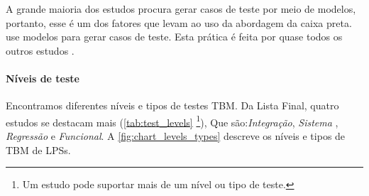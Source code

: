 A grande maioria dos estudos procura gerar casos de teste por meio de modelos, portanto, esse é um dos fatores que levam ao uso da abordagem da caixa preta. \citet{Steffens_et_al2012} use modelos para gerar casos de teste. Esta prática é feita por quase todos os outros estudos \cite{cichos2011model, oster2011pairwise, samih2014deriving, lackner2014model, Garcia_et_al2010}.


\paragraph{\textbf{Níveis de teste}}

Encontramos diferentes níveis e tipos de testes TBM. Da Lista Final, quatro estudos se destacam mais (\ref{tab:test_levels} \footnote{Um estudo pode suportar mais de um nível ou tipo de teste.}), Que são:\textit{Integração}, \textit{Sistema }, \textit{Regressão} e \textit{Funcional}. A \ref{fig:chart_levels_types} descreve os níveis e tipos de TBM de LPSs.

